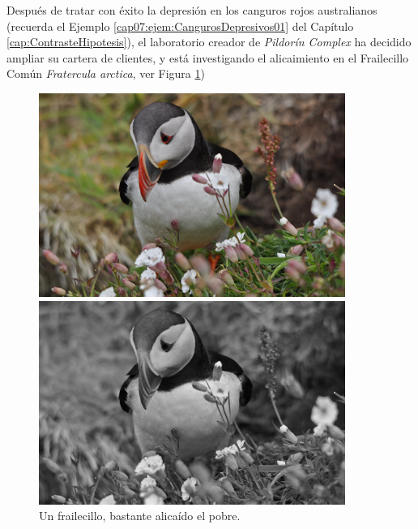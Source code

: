 \begin{ejemplo}
\label{cap11:ejem:Anova01}
Después de tratar con éxito la depresión en los canguros rojos australianos (recuerda el Ejemplo
\ref{cap07:ejem:CangurosDepresivos01} del Capítulo \ref{cap:ContrasteHipotesis}), el laboratorio
creador de {\em Pildorín Complex} ha decidido ampliar su cartera de clientes, y está investigando
el alicaimiento en el Frailecillo Común {\em Fratercula arctica}, ver Figura
\ref{cap11:fig:Frailecillo})

\begin{figure}[htbp]
\begin{center}
\begin{enColor}
\includegraphics[width=10cm]{../fig/Cap11-FrailecilloAlicaido.png}
\end{enColor}
\begin{bn}
\includegraphics[width=10cm]{../fig/Cap11-FrailecilloAlicaido-bn.png}
\end{bn}
\caption{Un frailecillo, bastante alicaído el pobre.}
\label{cap11:fig:Frailecillo}
\end{center}
\end{figure}


\end{ejemplo}
